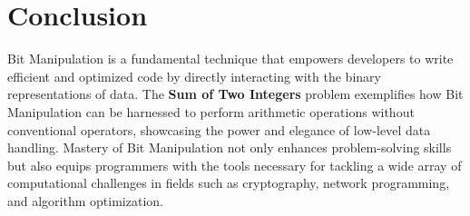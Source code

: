 \section*{Conclusion}

Bit Manipulation is a fundamental technique that empowers developers to write efficient and optimized code by directly interacting with the binary representations of data. The \textbf{Sum of Two Integers} problem exemplifies how Bit Manipulation can be harnessed to perform arithmetic operations without conventional operators, showcasing the power and elegance of low-level data handling. Mastery of Bit Manipulation not only enhances problem-solving skills but also equips programmers with the tools necessary for tackling a wide array of computational challenges in fields such as cryptography, network programming, and algorithm optimization.

\printindex